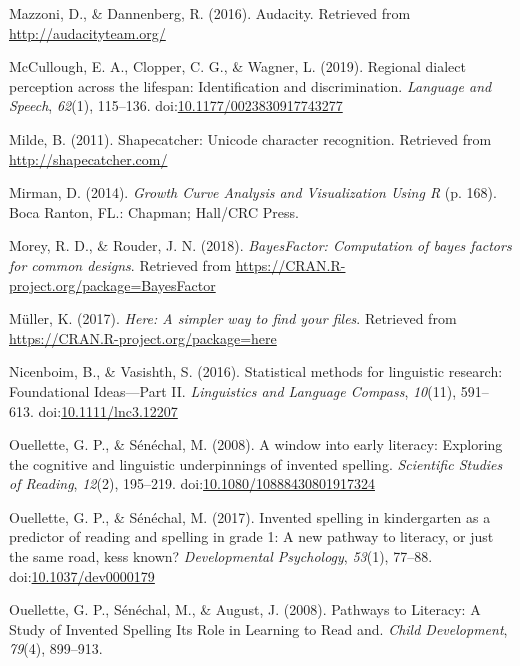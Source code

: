 \documentclass[doc,floatsintext]{apa6}
\begin{document}
\hypertarget{ref-Mazzoni2016}{}
Mazzoni, D., \& Dannenberg, R. (2016). Audacity. Retrieved from
\url{http://audacityteam.org/}

\hypertarget{ref-McCullough2019}{}
McCullough, E. A., Clopper, C. G., \& Wagner, L. (2019). Regional
dialect perception across the lifespan: Identification and
discrimination. \emph{Language and Speech}, \emph{62}(1), 115--136.
doi:\href{https://doi.org/10.1177/0023830917743277}{10.1177/0023830917743277}

\hypertarget{ref-Milde2011}{}
Milde, B. (2011). Shapecatcher: Unicode character recognition. Retrieved
from \url{http://shapecatcher.com/}

\hypertarget{ref-Mirman2014}{}
Mirman, D. (2014). \emph{Growth Curve Analysis and Visualization Using
R} (p. 168). Boca Ranton, FL.: Chapman; Hall/CRC Press.

\hypertarget{ref-R-BayesFactor}{}
Morey, R. D., \& Rouder, J. N. (2018). \emph{BayesFactor: Computation of
bayes factors for common designs}. Retrieved from
\url{https://CRAN.R-project.org/package=BayesFactor}

\hypertarget{ref-R-here}{}
Müller, K. (2017). \emph{Here: A simpler way to find your files}.
Retrieved from \url{https://CRAN.R-project.org/package=here}

\hypertarget{ref-Nicenboim2016}{}
Nicenboim, B., \& Vasishth, S. (2016). Statistical methods for
linguistic research: Foundational Ideas---Part II. \emph{Linguistics and
Language Compass}, \emph{10}(11), 591--613.
doi:\href{https://doi.org/10.1111/lnc3.12207}{10.1111/lnc3.12207}

\hypertarget{ref-Ouellette2008b}{}
Ouellette, G. P., \& Sénéchal, M. (2008). A window into early literacy:
Exploring the cognitive and linguistic underpinnings of invented
spelling. \emph{Scientific Studies of Reading}, \emph{12}(2), 195--219.
doi:\href{https://doi.org/10.1080/10888430801917324}{10.1080/10888430801917324}

\hypertarget{ref-Ouellette2017}{}
Ouellette, G. P., \& Sénéchal, M. (2017). Invented spelling in
kindergarten as a predictor of reading and spelling in grade 1: A new
pathway to literacy, or just the same road, kess known?
\emph{Developmental Psychology}, \emph{53}(1), 77--88.
doi:\href{https://doi.org/10.1037/dev0000179}{10.1037/dev0000179}

\hypertarget{ref-Ouellette2008a}{}
Ouellette, G. P., Sénéchal, M., \& August, J. (2008). Pathways to
Literacy: A Study of Invented Spelling Its Role in Learning to Read and.
\emph{Child Development}, \emph{79}(4), 899--913.
\end{document}
